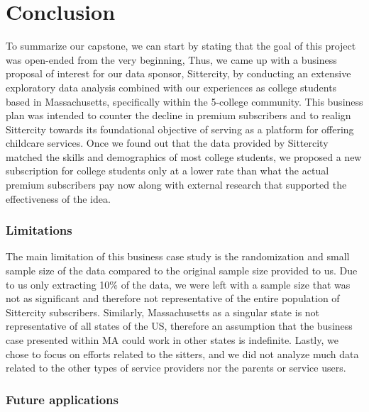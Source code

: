\documentclass[12pt]{article}
\begin{document}
\hypertarget{conclusion}{%
\section{Conclusion}\label{conclusion}}

To summarize our capstone, we can start by stating that the goal of this
project was open-ended from the very beginning, Thus, we came up with a
business proposal of interest for our data sponsor, Sittercity, by
conducting an extensive exploratory data analysis combined with our
experiences as college students based in Massachusetts, specifically
within the 5-college community. This business plan was intended to
counter the decline in premium subscribers and to realign Sittercity
towards its foundational objective of serving as a platform for offering
childcare services. Once we found out that the data provided by
Sittercity matched the skills and demographics of most college students,
we proposed a new subscription for college students only at a lower rate
than what the actual premium subscribers pay now along with external
research that supported the effectiveness of the idea.~

\hypertarget{limitations}{%
\subsubsection{\texorpdfstring{\textbf{Limitations}}{Limitations}}\label{limitations}}

The main limitation of this business case study is the randomization and
small sample size of the data compared to the original sample size
provided to us. Due to us only extracting 10\% of the data, we were left
with a sample size that was not as significant and therefore not
representative of the entire population of Sittercity subscribers.
Similarly, Massachusetts as a singular state is not representative of
all states of the US, therefore an assumption that the business case
presented within MA could work in other states is indefinite. Lastly, we
chose to focus on efforts related to the sitters, and we did not analyze
much data related to the other types of service providers nor the
parents or service users.~

\hypertarget{future-applications}{%
\subsubsection{\texorpdfstring{\textbf{Future
applications}}{Future applications}}\label{future-applications}}
\end{document}
